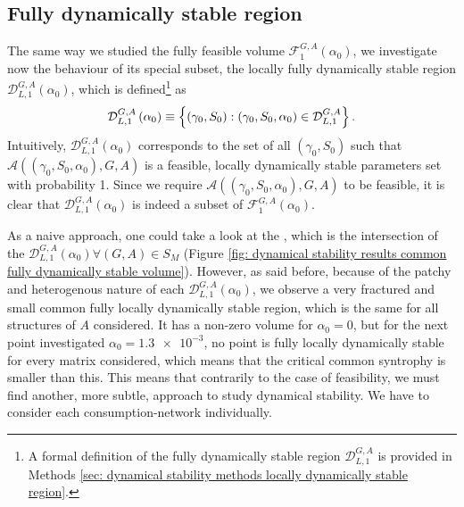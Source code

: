 \documentclass[12pt, titlepage]{report}
\begin{document}
\subsection{Fully dynamically stable region}
The same way we studied the fully feasible volume $\mathcal{F}_{1}^{G,A}(\alpha_0)$, we investigate now the behaviour of its special subset, the locally fully dynamically stable region $\mathcal{D}^{G,A}_{L,1}\left(\alpha_0\right)$, which is defined\footnote{A formal definition of the fully dynamically stable region $\mathcal{D}^{G,A}_{L,1}$ is provided in Methods \ref{sec: dynamical stability methods locally dynamically stable region}.} as
\begin{equation}
\mathcal{D}_{L,1}^{G,A}\left(\alpha_0\right) \equiv \left\{ (\gamma_0, S_0) : (\gamma_0, S_0, \alpha_0) \in \mathcal{D}^{G,A}_{L,1} \right\}.
\end{equation}
 Intuitively, $\mathcal{D}^{G,A}_{L,1}\left(\alpha_0\right)$ corresponds to the set of all $(\gamma_0, S_0)$ such that $\mathcal{A}\left((\gamma_0, S_0, \alpha_0), G, A\right)$ is a feasible, locally dynamically stable parameters set with probability 1. Since we require $\mathcal{A}\left((\gamma_0, S_0, \alpha_0), G, A\right)$ to be feasible, it is clear that $\mathcal{D}^{G,A}_{L,1}\left(\alpha_0\right)$ is indeed a subset of $\mathcal{F}^{G,A}_1\left(\alpha_0\right)$.

 As a naive approach, one could take a look at the , which is the intersection of the $\mathcal{D}_{L,1}^{G,A}(\alpha_0) \forall (G,A) \in S_M$ (Figure \ref{fig: dynamical stability results common fully dynamically stable volume}). However, as said before, because of the patchy and heterogenous nature of each $\mathcal{D}_{L,1}^{G,A}(\alpha_0)$, we observe a very fractured and small common fully locally dynamically stable region, which is the same for all structures of $A$ considered. It has a non-zero volume for $\alpha_0=0$, but for the next point investigated $\alpha_0=\num{1.3e-3}$, no point is fully locally dynamically stable for every matrix considered, which means that the critical common syntrophy is smaller than this. This means that contrarily to the case of feasibility, we must find another, more subtle, approach to study dynamical stability. We have to consider each consumption-network individually.
\end{document}
